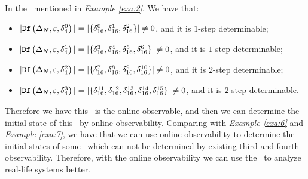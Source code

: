 \begin{example}
In the \BCN\ mentioned in {\em Example \ref{exa:2}}.  We have that:
 \begin{itemize}
 \item $|{\tt Df}\left(\Delta_N,\varepsilon, \delta_{4}^0\right)|=|\{\delta_{16}^0,\delta_{16}^1,\delta_{16}^2\}|\neq 0$, and it is $1$-step determinable;
 \item $|{\tt Df}\left(\Delta_N,\varepsilon, \delta_{4}^1\right)|=|\{\delta_{16}^3,\delta_{16}^4,\delta_{16}^5,\delta_{16}^6\}|\neq 0$, and it is $1$-step determinable;
 \item $|{\tt Df}\left(\Delta_N,\varepsilon, \delta_{4}^2\right)|=|\{\delta_{16}^7,\delta_{16}^8,\delta_{16}^{9},\delta_{16}^{10}\}|\neq 0$, and it is $2$-step determinable;
 \item $|{\tt Df}\left(\Delta_N,\varepsilon, \delta_{4}^3\right)|=|\{\delta_{16}^{11},\delta_{16}^{12},\delta_{16}^{13},\delta_{16}^{14},\delta_{16}^{15}\}|\neq 0$, and it is $2$-step determinable.
 \end{itemize}
 
Therefore we have this \BCN\ is the online observable, and then we can determine the initial state of this \BCN\ by online observability. Comparing with {\em Example \ref{exa:6}} and {\em Example \ref{exa:7}}, we have that we can use online observability to determine the initial states of some \BCNs\ which can not be determined by existing third and fourth observability. Therefore, with the online observability we can use the \BCN\ to analyze real-life systems better.
\label{exa:10}
\end{example}  
